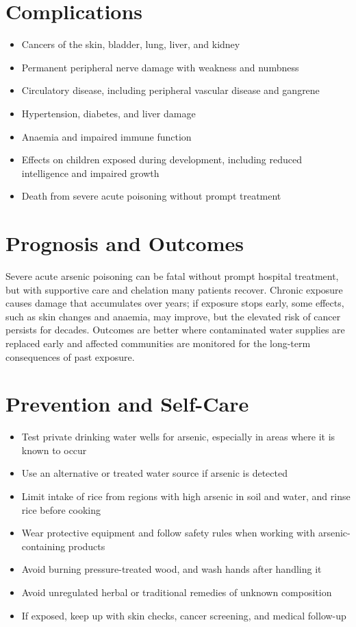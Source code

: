 \section*{Complications}
\begin{itemize}
    \item Cancers of the skin, bladder, lung, liver, and kidney
    \item Permanent peripheral nerve damage with weakness and numbness
    \item Circulatory disease, including peripheral vascular disease and gangrene
    \item Hypertension, diabetes, and liver damage
    \item Anaemia and impaired immune function
    \item Effects on children exposed during development, including reduced intelligence and impaired growth
    \item Death from severe acute poisoning without prompt treatment
\end{itemize}

\section*{Prognosis and Outcomes}
Severe acute arsenic poisoning can be fatal without prompt hospital treatment, but with supportive care and chelation many patients recover. Chronic exposure causes damage that accumulates over years; if exposure stops early, some effects, such as skin changes and anaemia, may improve, but the elevated risk of cancer persists for decades. Outcomes are better where contaminated water supplies are replaced early and affected communities are monitored for the long-term consequences of past exposure.

\section*{Prevention and Self-Care}
\begin{itemize}
    \item Test private drinking water wells for arsenic, especially in areas where it is known to occur
    \item Use an alternative or treated water source if arsenic is detected
    \item Limit intake of rice from regions with high arsenic in soil and water, and rinse rice before cooking
    \item Wear protective equipment and follow safety rules when working with arsenic-containing products
    \item Avoid burning pressure-treated wood, and wash hands after handling it
    \item Avoid unregulated herbal or traditional remedies of unknown composition
    \item If exposed, keep up with skin checks, cancer screening, and medical follow-up
\end{itemize}

